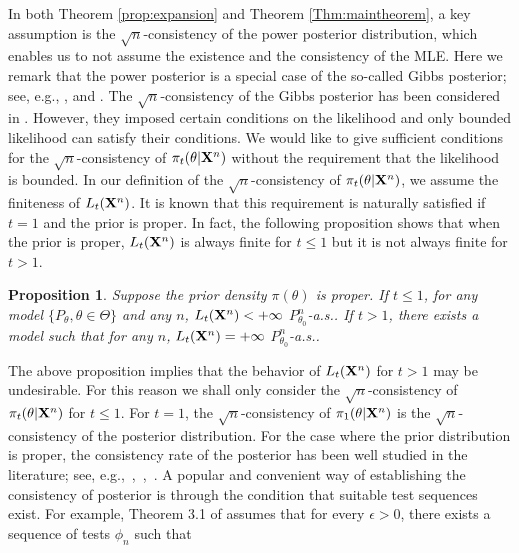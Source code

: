 \documentclass[11pt]{article}
\theoremstyle{plain}
\newtheorem{proposition}{\quad\quad Proposition}
\theoremstyle{definition}
\theoremstyle{remark}
\begin{document}
In both Theorem \ref{prop:expansion} and Theorem \ref{Thm:maintheorem},
a key assumption is the $\sqrt{n}$-consistency of the power posterior distribution, which enables us to not assume the existence and the consistency of the MLE.
Here we remark that the power posterior is a special case of the so-called Gibbs posterior; see, e.g., \cite{Chernozhukov2003}, \cite{Jiang2008} and \cite{Alquier2016}.
The $\sqrt{n}$-consistency of the Gibbs posterior has been considered in \cite{Chernozhukov2003}.
However, they imposed certain conditions on the likelihood and only bounded likelihood can satisfy their conditions.
We would like to give sufficient conditions for the $\sqrt{n}$-consistency of $\pi_t(\theta|\mathbf{X}^{n})$ without the requirement that the likelihood is bounded.
In our definition of the $\sqrt{n}$-consistency of $\pi_t(\theta| \mathbf{X}^n)$, we assume the finiteness of $L_t(\mathbf{X}^n)$.
It is known that this requirement is naturally satisfied if $t=1$ and the prior is proper.
In fact, the following proposition shows that when the prior is proper, $L_t(\mathbf{X}^n)$ is always finite for $t\leq 1$ but it is not always finite for $t>1$.
\begin{proposition}
    Suppose the prior density $\pi(\theta)$ is proper.
    If $t\leq 1$, for any model $\{P_{\theta}, \theta \in \Theta \}$ and any $n$, $L_t(\mathbf{X}^{n})< +\infty$ $P_{\theta_0}^n$-a.s..
    If $t> 1$, there exists a model such that for any $n$, $L_t(\mathbf{X}^{n}) = +\infty$ $P_{\theta_0}^n$-a.s..
    \label{exprop}
\end{proposition}
The above proposition implies that the behavior of $L_t(\mathbf{X}^{n})$ for $t>1$ may be undesirable.
For this reason we shall only consider the $\sqrt n$-consistency of $\pi_t(\theta | \mathbf{X}^{n})$ for $t\leq 1$.
For $t=1$, the $\sqrt{n}$-consistency of $\pi_1(\theta | \mathbf{X}^{n})$ is the $\sqrt{n}$-consistency of the posterior distribution.
For the case where the prior distribution is proper,
the consistency rate of the posterior has been well studied in the literature; see, e.g.,~\cite{ghosal2000},~\cite{Shen2001Rates},~\cite{vaart2007convergence}.
A popular and convenient way of establishing the consistency of posterior is through the condition that suitable test sequences exist.
For example, Theorem 3.1 of \cite{Kleijn2012The} assumes that for every $\epsilon>0$, there exists a sequence of tests $\phi_n$ such that
\end{document}
